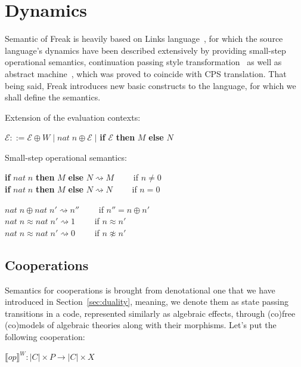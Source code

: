 \documentclass[declaration,shortabstract]{iithesis}
\theoremstyle{definition} \newtheorem{definition}{Definition}[chapter]
\theoremstyle{remark} \newtheorem{remark}[definition]{Observation}
\theoremstyle{plain} \newtheorem{theorem}[definition]{Theorem}
\theoremstyle{plain} \newtheorem{lemma}[definition]{Lemma}
\begin{document}
\section{Dynamics}

    Semantic of Freak is heavily based on Links language~\cite{handlers-cps-journal},
    for which the source language's dynamics have been described extensively by
    providing small-step operational semantics, continuation passing style
    transformation~\cite{handlers-cps} as well as abstract
    machine~\cite{liberating-effects}, which was proved to coincide with CPS
    translation. That being said, Freak introduces new basic constructs to the
    language, for which we shall define the semantics.

    \noindent
    Extension of the evaluation contexts:

    \noindent
    $\mathcal{E} ::= \mathcal{E} \oplus W \; | \; nat \; n \oplus \mathcal{E} \; |$ \textbf{if} $\mathcal{E}$ \textbf{then} $M$ \textbf{else} $N$

    \noindent
    Small-step operational semantics:

    \noindent
    \textbf{if} $nat \; n$ \textbf{then} $M$ \textbf{else} $N \rightsquigarrow M \quad \quad $ if $n \neq 0$ \\
    \textbf{if} $nat \; n$ \textbf{then} $M$ \textbf{else} $N \rightsquigarrow N \quad \quad $ if $n = 0$

    \noindent
    $nat \; n \oplus nat \; n' \rightsquigarrow n'' \quad \quad $    if $ n'' = n \oplus n' $ \\
    $nat \; n \approx nat \; n' \rightsquigarrow 1  \quad \quad $    \; if $ n \approx n' $ \\
    $nat \; n \approx nat \; n' \rightsquigarrow 0  \quad \quad $    \; if $ n \not\approx n' $

    \subsection{Cooperations}\label{subsec:calc-cohandlers}

    Semantics for cooperations is brought from denotational one that we have
    introduced in Section~\ref{sec:duality}, meaning, we denote them
    as state passing transitions in a code, represented similarly as algebraic
    effects, through (co)free (co)models of algebraic theories along with their
    morphisms. Let's put the following cooperation:

    \begin{center}
        $ {\llbracket op \rrbracket}^W : {|C|} \times {P} \rightarrow  {|C|} \times {X} $
    \end{center}
\end{document}

